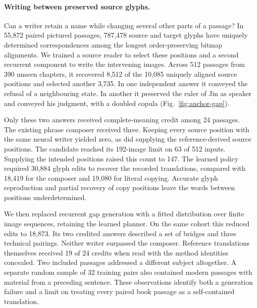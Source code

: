 \paragraph{Writing between preserved source glyphs.}
Can a writer retain a name while changing several other parts of a passage? In 55,872 paired pictured passages, 787,478 source and target glyphs have uniquely determined correspondences among the longest order-preserving bitmap alignments. We trained a source reader to select these positions and a second recurrent component to write the intervening images. Across 512 passages from 390 unseen chapters, it recovered 8,512 of the 10,085 uniquely aligned source positions and selected another 3,735. In one independent answer it conveyed the refusal of a neighbouring state. In another it preserved the ruler of Jin as speaker and conveyed his judgment, with a doubled copula (Fig.~\ref{fig:anchor-gap}).

Only these two answers received complete-meaning credit among 24 passages. The existing phrase composer received three. Keeping every source position with the same neural writer yielded zero, as did supplying the reference-derived source positions. The candidate reached its 192-image limit on 63 of 512 inputs. Supplying the intended positions raised this count to 147. The learned policy required 30,884 glyph edits to recover the recorded translations, compared with 18,419 for the composer and 19,080 for literal copying. Accurate glyph reproduction and partial recovery of copy positions leave the words between positions underdetermined.

We then replaced recurrent gap generation with a fitted distribution over finite image sequences, retaining the learned planner. On the same cohort this reduced edits to 18,873. Its two credited answers described a set of bridges and three technical pairings. Neither writer surpassed the composer. Reference translations themselves received 19 of 24 credits when read with the method identities concealed. Two included passages addressed a different subject altogether. A separate random sample of 32 training pairs also contained modern passages with material from a preceding sentence. These observations identify both a generation failure and a limit on treating every paired book passage as a self-contained translation.
